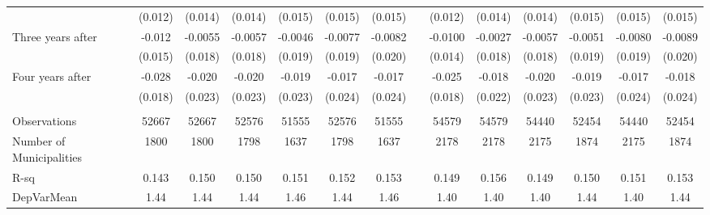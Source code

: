 \begin{tabular}{lccccccccccccc}
      & (0.012) & (0.014) & (0.014) & (0.015) & (0.015) & (0.015) &       & (0.012) & (0.014) & (0.014) & (0.015) & (0.015) & (0.015) \\
Three years after & -0.012 & -0.0055 & -0.0057 & -0.0046 & -0.0077 & -0.0082 &       & -0.0100 & -0.0027 & -0.0057 & -0.0051 & -0.0080 & -0.0089 \\
      & (0.015) & (0.018) & (0.018) & (0.019) & (0.019) & (0.020) &       & (0.014) & (0.018) & (0.018) & (0.019) & (0.019) & (0.020) \\
Four years after & -0.028 & -0.020 & -0.020 & -0.019 & -0.017 & -0.017 &       & -0.025 & -0.018 & -0.020 & -0.019 & -0.017 & -0.018 \\
      & (0.018) & (0.023) & (0.023) & (0.023) & (0.024) & (0.024) &       & (0.018) & (0.022) & (0.023) & (0.023) & (0.024) & (0.024) \\
      &       &       &       &       &       &       &       &       &       &       &       &       &  \\
\midrule
Observations & 52667 & 52667 & 52576 & 51555 & 52576 & 51555 &       & 54579 & 54579 & 54440 & 52454 & 54440 & 52454 \\
Number of Municipalities & 1800  & 1800  & 1798  & 1637  & 1798  & 1637  &       & 2178  & 2178  & 2175  & 1874  & 2175  & 1874 \\
R-sq  & 0.143 & 0.150 & 0.150 & 0.151 & 0.152 & 0.153 &       & 0.149 & 0.156 & 0.149 & 0.150 & 0.151 & 0.153 \\
DepVarMean & 1.44  & 1.44  & 1.44  & 1.46  & 1.44  & 1.46  &       & 1.40  & 1.40  & 1.40  & 1.44  & 1.40  & 1.44 \\
\bottomrule
\bottomrule
\end{tabular}%
